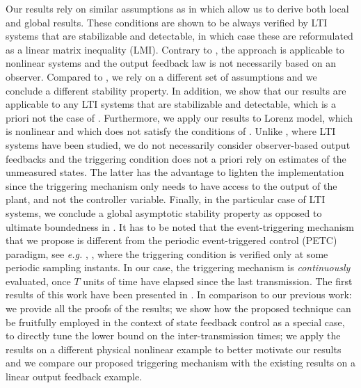\documentclass[a4paper, 9pt, twocolumn]{IEEEtran}
\theoremstyle{plain}
\theoremstyle{definition}
\begin{document}
Our results rely on similar assumptions as in \cite{Nesic2009explicit} which allow us to derive both local and global results. These conditions are shown to be always verified by LTI systems that are stabilizable and detectable, in which case these are reformulated as a linear matrix inequality (LMI). Contrary to \cite{Forni2014event}, the approach is applicable to nonlinear systems and the output feedback law is not necessarily based on an observer. Compared to \cite{Yu2012event}, we rely on a different set of assumptions and we conclude a different stability property. In addition, we show that our results are applicable to any LTI systems that are stabilizable and detectable, which is a priori not the case of \cite{Yu2012event}. Furthermore, we apply our results to Lorenz model, which is nonlinear and which does not satisfy the conditions of \cite{Yu2012event}. Unlike \cite{Tallapragada2012event-CDC}, where LTI systems have been studied, we do not necessarily consider observer-based output feedbacks and the triggering condition does not a priori rely on estimates of the unmeasured states. The latter has the advantage to lighten the implementation since the triggering mechanism only needs to have access to the output of the plant, and not the controller variable. Finally, in the particular case of LTI systems, we conclude a global asymptotic stability property as opposed to ultimate boundedness in \cite{Donkers2012output}. It has to be noted that the event-triggering mechanism that we propose is different from the periodic event-triggered control (PETC) paradigm, see \textit{e.g.} \cite{Heemels2013PETC}, \cite{Romain2013periodic}, where the triggering condition is verified only at some periodic sampling instants. In our case, the triggering mechanism is \textit{continuously} evaluated, once $T$ units of time have elapsed since the last transmission. The first results of this work have been presented in \cite{Abdelrahim2014stabilization}. In comparison to our previous work: we provide all the proofs of the results; we show how the proposed technique can be fruitfully employed in the context of state feedback control as a special case, to directly tune the lower bound on the inter-transmission times; we apply the results on a different physical nonlinear example to better motivate our results and we compare our proposed triggering mechanism with the existing results on a linear output feedback example.
\end{document}
